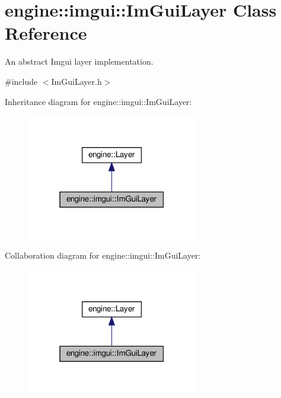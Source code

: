 \hypertarget{classengine_1_1imgui_1_1ImGuiLayer}{}\section{engine\+:\+:imgui\+:\+:Im\+Gui\+Layer Class Reference}
\label{classengine_1_1imgui_1_1ImGuiLayer}


An abstract Imgui layer implementation.  




{\ttfamily \#include $<$Im\+Gui\+Layer.\+h$>$}



Inheritance diagram for engine\+:\+:imgui\+:\+:Im\+Gui\+Layer\+:\nopagebreak
\begin{figure}[H]
\begin{center}
\leavevmode
\includegraphics[width=211pt]{classengine_1_1imgui_1_1ImGuiLayer__inherit__graph}
\end{center}
\end{figure}


Collaboration diagram for engine\+:\+:imgui\+:\+:Im\+Gui\+Layer\+:\nopagebreak
\begin{figure}[H]
\begin{center}
\leavevmode
\includegraphics[width=211pt]{classengine_1_1imgui_1_1ImGuiLayer__coll__graph}
\end{center}
\end{figure}
